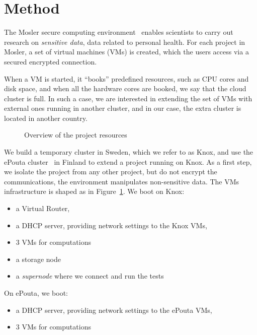 \section{Method}
\label{section:method}

The Mosler secure computing environment~\cite{mosler} enables
scientists to carry out research on \emph{sensitive data}, \eg data
related to personal health.
%
For each project in Mosler, a set of virtual machines (VMs) is
created, which the users access via a secured encrypted connection.

When a VM is started, it ``books'' predefined resources, such as CPU
cores and disk space, and when all the hardware cores are booked, we
say that the cloud cluster is full. In such a case, we are interested
in extending the set of VMs with external ones running in another
cluster, and in our case, the extra cluster is located in another
country.

\begin{figure}[b]
  \centering
  
  \caption{Overview of the project resources}
  \label{figure:overview}
\end{figure}

We build a temporary cluster in Sweden, which we refer to as Knox, and
use the ePouta cluster~\cite{epouta} in Finland to extend a project
running on Knox. As a first step, we isolate the project from any
other project, but do not encrypt the communications, \ie the
environment manipulates non-sensitive data.
%
The VMs infrastructure is shaped as in
Figure~\ref{figure:overview}. We boot on Knox:
\begin{itemize}
\item a Virtual Router,
\item a DHCP server, providing network settings to the Knox VMs,
\item 3 VMs for computations
\item a storage node
\item a \emph{supernode} where we connect and run the tests
\end{itemize}
On ePouta, we boot:
\begin{itemize}
\item a DHCP server, providing network settings to the ePouta VMs,
\item 3 VMs for computations
\end{itemize}


